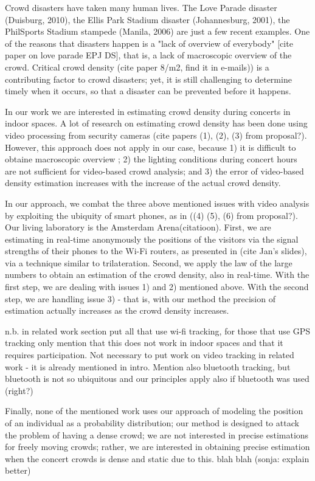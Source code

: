 \documentclass[10pt,a4paper]{article}
\begin{document}
Crowd disasters have taken many human lives. The Love Parade disaster (Duisburg, 2010), the Ellis Park Stadium disaster (Johannesburg, 2001), the PhilSports Stadium stampede (Manila, 2006) are just a few recent examples. One of the reasons that disasters happen is a "lack of overview of everybody" [cite paper on love parade EPJ DS], that is, a lack of macroscopic overview of the crowd. Critical crowd density (cite paper 8/m2, find it in e-mails)) is a contributing factor to crowd disasters; yet, it is still challenging to determine timely when it occurs, so that a disaster can be prevented before it happens. 

In our work we are interested in estimating crowd density during concerts in indoor spaces. A lot of research on estimating crowd density has been done using video processing from security cameras (cite papers (1), (2), (3) from proposal?). However, this approach does not apply in our case, because 1)  it is difficult to obtaine macroscopic overview ; 2) the lighting conditions during concert hours are not sufficient for video-based crowd analysis; and 3) the error of video-based density estimation increases with the increase of the actual crowd density.  

In our approach, we combat the three above mentioned issues with video analysis by exploiting the ubiquity of smart phones, as in ((4) (5), (6) from proposal?). Our living laboratory is the Amsterdam Arena(citatioon). First, we are estimating in real-time anonymously the positions of the visitors via the signal strengths of their phones to the  Wi-Fi routers, as presented in (cite Jan's slides), via a technique similar to trilateration. Second, we apply the law of the large numbers to obtain an estimation of the crowd density, also in real-time. With the first step, we are dealing with issues 1) and 2) mentioned above. With the second step, we are handling issue 3) -  that is, with our method the precision of estimation actually increases as the crowd density increases. 




n.b. in related work section put all that use wi-fi tracking, for those that use GPS tracking only mention that this does not work in indoor spaces and that it requires participation. Not necessary to put work on video tracking in related work - it is already mentioned in intro. Mention also bluetooth tracking, but bluetooth is not so ubiquitous and our principles apply also if bluetooth was used (right?) 

Finally, none of the mentioned work uses our approach of modeling the position of an individual as a probability distribution; our method is designed to attack the problem of having a dense crowd; we are not interested in precise estimations for freely moving crowds; rather, we are interested in obtaining precise estimation when the  concert crowds is dense and static due to this. blah blah (sonja: explain better)
\end{document}

